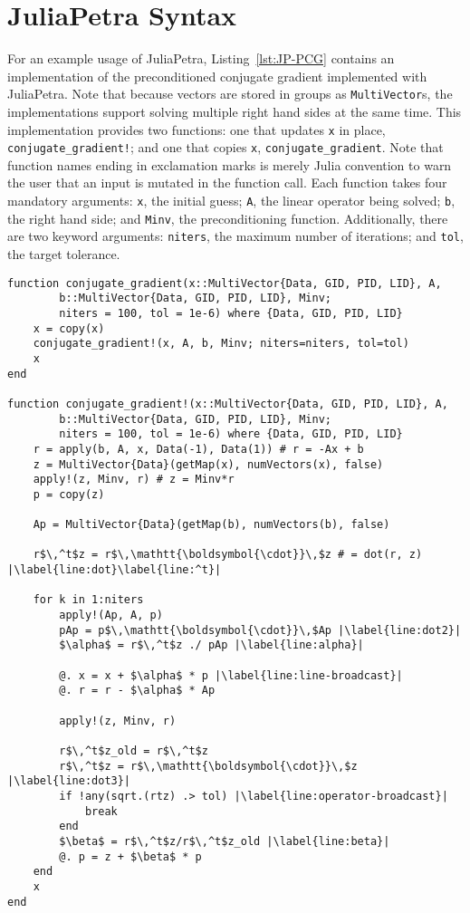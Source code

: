 \documentclass[acmsmall]{acmart}
\newcommand{\snippet}[1]{\lstinline{#1}}
\begin{document}
	\section{JuliaPetra Syntax}
	
	For an example usage of JuliaPetra, Listing~\ref{lst:JP-PCG} contains an implementation of the preconditioned conjugate gradient implemented with JuliaPetra.
	Note that because vectors are stored in groups as \snippet{MultiVector}s, the implementations support solving multiple right hand sides at the same time.
	This implementation provides two functions: one that updates \snippet{x} in place, \snippet{conjugate_gradient!}; and one that copies \snippet{x}, \snippet{conjugate_gradient}.
	Note that function names ending in exclamation marks is merely Julia convention to warn the user that an input is mutated in the function call.
	Each function takes four mandatory arguments: \snippet{x}, the initial guess; \snippet{A}, the linear operator being solved; \snippet{b}, the right hand side; and \snippet{Minv}, the preconditioning function.
	Additionally, there are two keyword arguments: \snippet{niters}, the maximum number of iterations; and \snippet{tol}, the target tolerance.
	
	\begin{lstlisting}[float,
						caption=Preconditioned Conjugate Gradient in JuliaPetra,
						label=lst:JP-PCG,
						escapechar=|]
function conjugate_gradient(x::MultiVector{Data, GID, PID, LID}, A,
        b::MultiVector{Data, GID, PID, LID}, Minv;
        niters = 100, tol = 1e-6) where {Data, GID, PID, LID}
    x = copy(x)
    conjugate_gradient!(x, A, b, Minv; niters=niters, tol=tol)
    x
end

function conjugate_gradient!(x::MultiVector{Data, GID, PID, LID}, A,
        b::MultiVector{Data, GID, PID, LID}, Minv;
        niters = 100, tol = 1e-6) where {Data, GID, PID, LID}
    r = apply(b, A, x, Data(-1), Data(1)) # r = -Ax + b
    z = MultiVector{Data}(getMap(x), numVectors(x), false)
    apply!(z, Minv, r) # z = Minv*r
    p = copy(z)

    Ap = MultiVector{Data}(getMap(b), numVectors(b), false)

    r$\,^t$z = r$\,\mathtt{\boldsymbol{\cdot}}\,$z # = dot(r, z) |\label{line:dot}\label{line:^t}|

    for k in 1:niters
        apply!(Ap, A, p)
        pAp = p$\,\mathtt{\boldsymbol{\cdot}}\,$Ap |\label{line:dot2}|
        $\alpha$ = r$\,^t$z ./ pAp |\label{line:alpha}|

        @. x = x + $\alpha$ * p |\label{line:line-broadcast}|
        @. r = r - $\alpha$ * Ap

        apply!(z, Minv, r)

        r$\,^t$z_old = r$\,^t$z
        r$\,^t$z = r$\,\mathtt{\boldsymbol{\cdot}}\,$z |\label{line:dot3}|
        if !any(sqrt.(rtz) .> tol) |\label{line:operator-broadcast}|
            break
        end
        $\beta$ = r$\,^t$z/r$\,^t$z_old |\label{line:beta}|
        @. p = z + $\beta$ * p
    end
    x
end
	\end{lstlisting}
	
\end{document}
